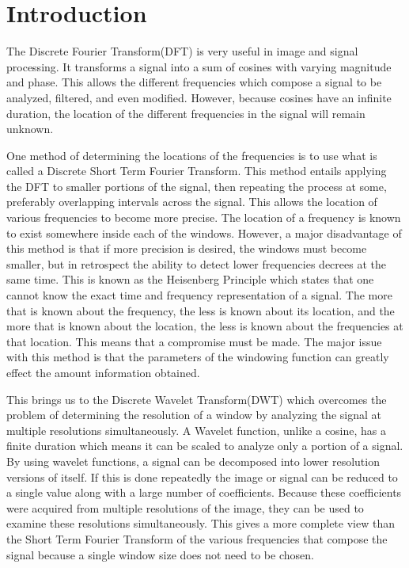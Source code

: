 \section{Introduction}

The Discrete Fourier Transform(DFT) is very useful in image and signal processing.  It transforms a signal into a sum of cosines with varying magnitude and phase.  This allows the different frequencies which compose a signal to be analyzed, filtered, and even modified.  However, because cosines have an infinite duration, the location of the different frequencies in the signal will remain unknown.

One method of determining the locations of the frequencies is to use what is called a Discrete Short Term Fourier Transform. This method entails applying the DFT to smaller portions of the signal, then repeating the process at some, preferably overlapping intervals across the signal.  This allows the location of various frequencies to become more precise.  The location of a frequency is known to exist somewhere inside each of the windows.  However, a major disadvantage of this method is that if more precision is desired, the windows must become smaller, but in retrospect the ability to detect lower frequencies decrees at the same time.  This is known as the Heisenberg Principle which states that one cannot know the exact time and frequency representation of a signal.  The more that is known about the frequency, the less is known about its location, and the more that is known about the location, the less is known about the frequencies at that location.  This means that a compromise must be made.  The major issue with this method is that the parameters of the windowing function can greatly effect the amount information obtained.

This brings us to the Discrete Wavelet Transform(DWT) which overcomes the problem of determining the resolution of a window by analyzing the signal at multiple resolutions simultaneously.  A Wavelet function, unlike a cosine, has a finite duration which means it can be scaled to analyze only a portion of a signal.  By using wavelet functions, a signal can be decomposed into lower resolution versions of itself.  If this is done repeatedly the image or signal can be reduced to a single value along with a large number of coefficients.  Because these coefficients were acquired from multiple resolutions of the image, they can be used to examine these resolutions simultaneously.  This gives a more complete view than the Short Term Fourier Transform of the various frequencies that compose the signal because a single window size does not need to be chosen.

